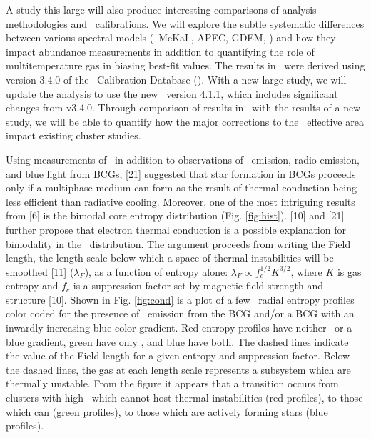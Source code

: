 \documentclass[letterpaper,11pt]{article}
\begin{document}
A study this large will also produce interesting comparisons of
analysis methodologies and \chandra\ calibrations. We will explore the
subtle systematic differences between various spectral models
(\eg\ MeKaL, APEC, GDEM, \etc) and how they impact abundance
measurements in addition to quantifying the role of multitemperature
gas in biasing best-fit values. The results in \accept\ were derived
using version 3.4.0 of the \chandra\ Calibration Database
(\caldb). With a new large study, we will update the analysis to use
the new \caldb\ version 4.1.1, which includes significant changes from
v3.4.0. Through comparison of results in \accept\ with the results of
a new study, we will be able to quantify how the major corrections to
the \chandra\ effective area impact existing cluster studies.

\large
\begin{center}
\end{center}
\normalsize

Using measurements of \kna\ in addition to observations of
\halpha\ emission, radio emission, and blue light from BCGs, [21]
suggested that star formation in BCGs proceeds only if a multiphase
medium can form as the result of thermal conduction being less
efficient than radiative cooling. Moreover, one of the most intriguing
results from [6] is the bimodal core entropy distribution
(Fig. \ref{fig:hist}). [10] and [21] further propose that electron
thermal conduction is a possible explanation for bimodality in the
\kna\ distribution. The argument proceeds from writing the Field
length, the length scale below which a space of thermal instabilities
will be smoothed [11] ($\lambda_F$), as a function of entropy alone:
$\lambda_F \propto f_c^{1/2}K^{3/2}$, where $K$ is gas entropy and
$f_c$ is a suppression factor set by magnetic field strength and
structure [10]. Shown in Fig. \ref{fig:cond} is a plot of a few
\accept\ radial entropy profiles color coded for the presence of
\halpha\ emission from the BCG and/or a BCG with an inwardly
increasing blue color gradient. Red entropy profiles have neither
\halpha\ or a blue gradient, green have only \halpha, and blue have
both. The dashed lines indicate the value of the Field length for a
given entropy and suppression factor. Below the dashed lines, the gas
at each length scale represents a subsystem which are thermally
unstable. From the figure it appears that a transition occurs from
clusters with high \kna\ which cannot host thermal instabilities (red
profiles), to those which can (green profiles), to those which are
actively forming stars (blue profiles).
\end{document}
